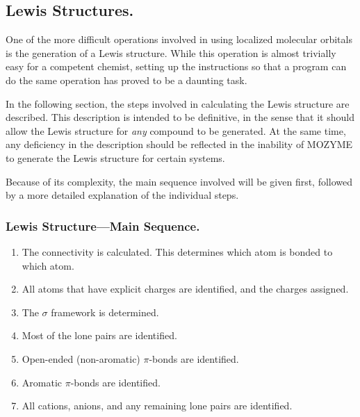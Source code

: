 \subsection{Lewis Structures.}
One of the more difficult operations involved in using localized molecular
orbitals is the generation of a Lewis structure.  While this operation is
almost trivially easy for a competent chemist, setting up the instructions so
that a program can do the same operation has proved to be a daunting task.

In the following section, the steps involved in calculating the Lewis structure
are described.  This description is intended to be definitive, in the sense
that it should allow the Lewis structure for {\em any} compound to be
generated. At the same time, any deficiency in the description should be
reflected in the inability of MOZYME to generate the Lewis structure for
certain systems.

Because of its complexity, the main sequence involved will be given first,
followed by a more detailed explanation of the individual steps.

\subsubsection{Lewis Structure---Main Sequence.}
\begin{enumerate}
\item The connectivity is calculated.  This determines which atom is bonded to
which atom.
\item All atoms that have explicit charges are identified, and the charges
assigned.
\item The $\sigma$ framework is determined.
\item Most of the lone pairs are identified.
\item Open-ended (non-aromatic) $\pi$-bonds are identified.
\item Aromatic $\pi$-bonds are identified.
\item All cations, anions, and any remaining lone pairs are identified.
\end{enumerate}


